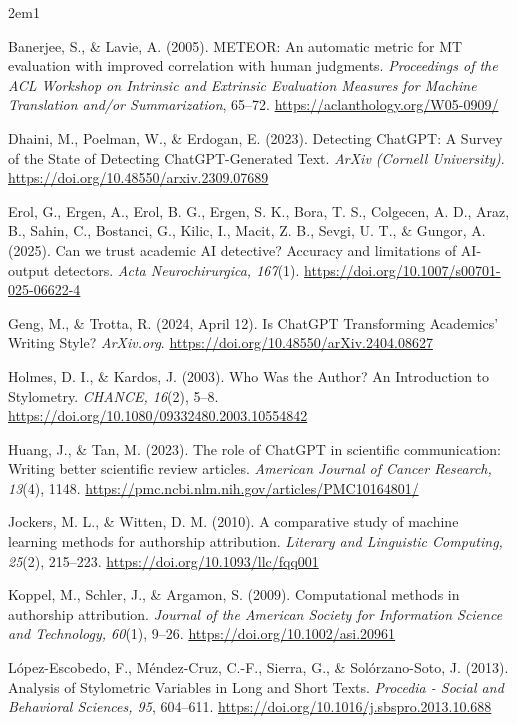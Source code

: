 \documentclass[12pt,a4paper]{article}
\begin{document}
\begin{hangparas}{2em}{1}

Banerjee, S., \& Lavie, A. (2005). METEOR: An automatic metric for MT evaluation with improved correlation with human judgments. \textit{Proceedings of the ACL Workshop on Intrinsic and Extrinsic Evaluation Measures for Machine Translation and/or Summarization}, 65--72. \url{https://aclanthology.org/W05-0909/}

Dhaini, M., Poelman, W., \& Erdogan, E. (2023). Detecting ChatGPT: A Survey of the State of Detecting ChatGPT-Generated Text. \textit{ArXiv (Cornell University)}. \url{https://doi.org/10.48550/arxiv.2309.07689}

Erol, G., Ergen, A., Erol, B. G., Ergen, S. K., Bora, T. S., Colgecen, A. D., Araz, B., Sahin, C., Bostanci, G., Kilic, I., Macit, Z. B., Sevgi, U. T., \& Gungor, A. (2025). Can we trust academic AI detective? Accuracy and limitations of AI-output detectors. \textit{Acta Neurochirurgica, 167}(1). \url{https://doi.org/10.1007/s00701-025-06622-4}

Geng, M., \& Trotta, R. (2024, April 12). Is ChatGPT Transforming Academics' Writing Style? \textit{ArXiv.org}. \url{https://doi.org/10.48550/arXiv.2404.08627}

Holmes, D. I., \& Kardos, J. (2003). Who Was the Author? An Introduction to Stylometry. \textit{CHANCE, 16}(2), 5--8. \url{https://doi.org/10.1080/09332480.2003.10554842}

Huang, J., \& Tan, M. (2023). The role of ChatGPT in scientific communication: Writing better scientific review articles. \textit{American Journal of Cancer Research, 13}(4), 1148. \url{https://pmc.ncbi.nlm.nih.gov/articles/PMC10164801/}

Jockers, M. L., \& Witten, D. M. (2010). A comparative study of machine learning methods for authorship attribution. \textit{Literary and Linguistic Computing, 25}(2), 215--223. \url{https://doi.org/10.1093/llc/fqq001}

Koppel, M., Schler, J., \& Argamon, S. (2009). Computational methods in authorship attribution. \textit{Journal of the American Society for Information Science and Technology, 60}(1), 9--26. \url{https://doi.org/10.1002/asi.20961}

L\'opez-Escobedo, F., M\'endez-Cruz, C.-F., Sierra, G., \& Sol\'orzano-Soto, J. (2013). Analysis of Stylometric Variables in Long and Short Texts. \textit{Procedia - Social and Behavioral Sciences, 95}, 604--611. \url{https://doi.org/10.1016/j.sbspro.2013.10.688}


\end{hangparas}
\end{document}
